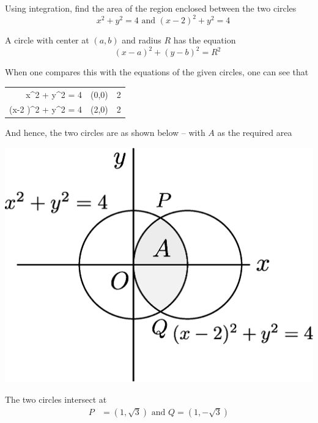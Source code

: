 \documentclass[14pt,fleqn]{extarticle}
\begin{document}
\newcommand\yone{4-x^2} 
\newcommand\ytwo{4- \left(x-2 \right)^2}
\newcommand\intg{\frac{a^2}{2}\sin^{-1}\frac{x}{a}+x\cdot\sqrt{a^2-x^2}}

Using integration, find the area of the region 
enclosed between the two circles 
\[ \quad x^2+y^2=4\text{ and } (x-2)^2 + y^2 = 4 \]
%

\newcard

A circle with center at $(a,b)$ and radius $R$ has the equation 
\[ \qquad \left(x-a \right)^2 + \left(y-b \right)^2 = R^2 \]

When one compares this with the equations of the given circles, one can see that 
\begin{center}
  \begin{tabular}{NNN}
   \toprule
         &  &   \\
   \midrule 
   x^2 + y^2 = 4 & (0,0) & 2 \\
    \midrule 
    \left(x-2 \right)^2 + y^2 = 4 & (2,0) & 2 \\
    \bottomrule
  \end{tabular}
\end{center}
And hence, the two circles are as shown below -- with $A$ as the required area 

\begin{center}
\includegraphics[scale=0.35]{figure.eps} 
\end{center} 

\newcard

The two circles intersect at 
\begin{align}
P &= \left(1,\sqrt{3} \right)\text{ and } Q = \left(1, -\sqrt{3} \right)
\end{align}
\end{document}
